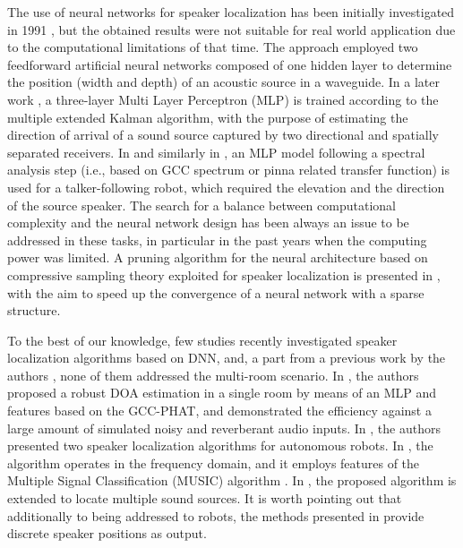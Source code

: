 \documentclass[review]{elsarticle}
\begin{document}
The use of neural networks for speaker localization has been initially investigated in 1991 \cite{zakarauskas1991artificial}, but the obtained results were not suitable for real world application due to the computational limitations of that time. The approach employed two feedforward artificial neural networks composed of one hidden layer to determine the position (width and depth) of an acoustic source in a waveguide.  In a later work \cite{datum1996artificial}, a three-layer Multi Layer Perceptron (MLP) is trained according to the multiple extended Kalman algorithm, with the purpose of estimating the direction of arrival of a sound source captured by two directional and spatially separated receivers. In \cite{Mumolo200369} and similarly in \cite{murray2011neural}, an MLP model following a spectral analysis step (i.e., based on GCC spectrum or pinna related transfer function) is used for a talker-following robot, which required the elevation and the direction of the source speaker. The search for a balance between computational complexity and the neural network design has been always an issue to be addressed in these tasks, in particular in the past years when the computing power was limited.  A pruning algorithm for the neural architecture based on compressive sampling theory exploited for speaker localization is presented in \cite{dehkordi2011compressive}, with the aim to speed up the convergence of a neural network with a sparse structure. 






To the best of our knowledge, few studies recently investigated speaker localization algorithms based on DNN, and, a part from a previous work by the authors \cite{vesperini2016sloc}, none of them addressed the multi-room scenario. In \cite{xiao2015learning}, the authors proposed a robust DOA estimation in a single room by means of an MLP and features based on the GCC-PHAT, and demonstrated the efficiency against a large amount of simulated noisy and reverberant audio inputs. In \cite{Takeda2016a,Takeda2016b}, the authors presented two speaker localization algorithms for autonomous robots. In \cite{Takeda2016a}, the algorithm operates in the frequency domain, and it employs features of the Multiple Signal Classification (MUSIC) algorithm \cite{Schmidt86}. In \cite{Takeda2016b}, the proposed algorithm is extended to locate multiple sound sources. It is worth pointing out that additionally to being addressed to robots, the methods presented in \cite{Takeda2016a,Takeda2016b} provide discrete speaker positions as output.
\end{document}
